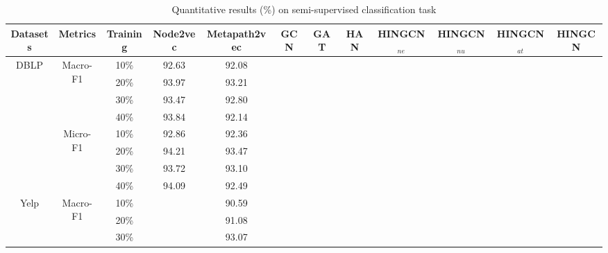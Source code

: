 \begin{table*}[!htbp]
\centering
\caption{Quantitative results (\%) on semi-supervised classification task}
\label{tab:result}
\begin{tabular}{|c|c|c||c|c|c|c|c||c|c|c|c|}
\hline
Datasets                  & Metrics                   & Training & Node2vec & Metapath2vec & GCN & GAT & HAN & HINGCN$_{ne}$ & HINGCN$_{nu}$ & HINGCN$_{at}$ & HINGCN \\ \hline
\multirow{8}{*}{DBLP}     & \multirow{4}{*}{Macro-F1} & 10\%     &  92.63   &   92.08      &     &     &     &        &        &        &        \\
                          &                           & 20\%     &  93.97   &   93.21      &     &     &     &        &        &        &        \\
                          &                           & 30\%     &  93.47   &   92.80      &     &     &     &        &        &        &        \\
                          &                           & 40\%     &  93.84   &   92.14      &     &     &     &        &        &        &        \\ \cline{2-12} 
                          & \multirow{4}{*}{Micro-F1} & 10\%     &  92.86   &   92.36      &     &     &     &        &        &        &        \\
                          &                           & 20\%     &  94.21   &   93.47      &     &     &     &        &        &        &        \\
                          &                           & 30\%     &  93.72   &   93.10      &     &     &     &        &        &        &        \\
                          &                           & 40\%     &  94.09   &   92.49      &     &     &     &        &        &        &        \\ \hline
\multirow{8}{*}{Yelp}     & \multirow{4}{*}{Macro-F1} & 10\%     &          &   90.59      &     &     &     &        &        &        &        \\
                          &                           & 20\%     &          &   91.08      &     &     &     &        &        &        &        \\
                          &                           & 30\%     &          &   93.07      &     &     &     &        &        &        &        \\

\end{tabular}
\end{table*}
